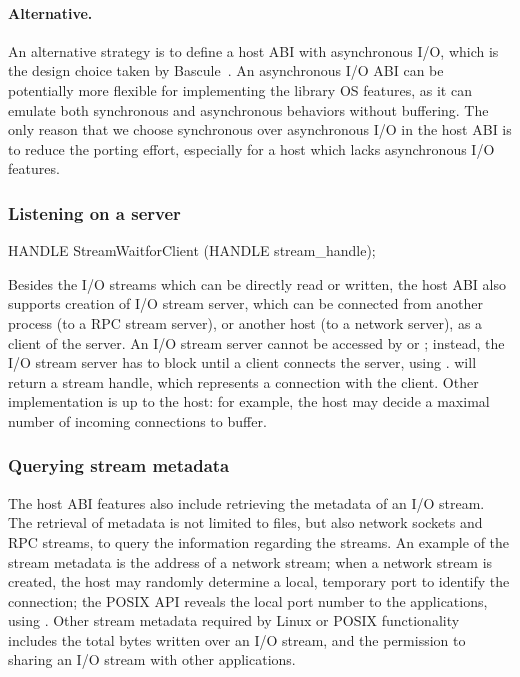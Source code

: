 \paragraph{Alternative.}
An alternative strategy is to define a host ABI with asynchronous I/O,
which is the design choice taken by Bascule~\cite{baumann13bascule}.
An asynchronous I/O ABI can be potentially
more flexible for implementing the library OS features,
as it can emulate both synchronous and asynchronous behaviors
without buffering.
The only reason that we choose synchronous over asynchronous I/O
in the host ABI is to reduce the porting effort,
especially for a host which lacks
asynchronous I/O features.



\subsubsection*{Listening on a server}


\begin{paldef}
HANDLE StreamWaitforClient (HANDLE stream_handle);
\end{paldef} 

Besides the I/O streams which can be directly read or written,
the host ABI also supports creation
of I/O stream server, which can be
connected from another process (to a RPC stream server), or another host (to a network server), as a client of the server.
An I/O stream server cannot be accessed by  or ;
instead, the I/O stream server has to block until a client
connects the server, using .
 will return a stream handle, which represents a connection with the client.
Other implementation
is up to the host: for example,
the host may decide a maximal number of incoming connections to buffer.









\subsubsection*{Querying stream metadata}

The host ABI features also include retrieving the metadata of an I/O stream.
The retrieval of metadata is not limited to files,
but also network sockets and RPC streams, to query the information regarding the streams.
An example of the stream metadata is the address of a network stream;
when a network stream is created,
the host may randomly determine a local, temporary port to identify the connection;
the POSIX API
reveals the local port number
to the applications,
using .
Other stream metadata required by Linux or POSIX functionality
includes the total bytes written over an I/O stream, and the permission to sharing an I/O stream with other applications.



